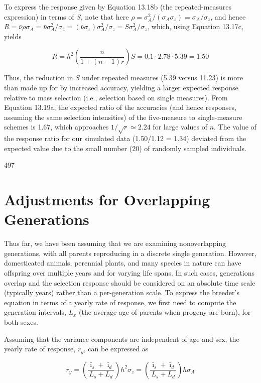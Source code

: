 \documentclass{article}
\begin{document}
To express the response given by Equation 13.18b (the repeated-measures expression) in terms of $S$, note that here $\rho = \sigma_A^2 / (\sigma_A \sigma_z) = \sigma_A / \sigma_z$, and hence $R = \bar{\nu} \rho \sigma_A = \bar{\nu} \sigma_A^2 / \sigma_z = (\bar{\nu} \sigma_z) \sigma_A^2 / \sigma_z = S \sigma_A^2 / \sigma_z$, which, using Equation 13.17c, yields

\begin{equation}
R=h^{2}\left(\frac{n}{1+(n-1)r}\right)S=0.1\cdot2.78\cdot5.39=1.50
\end{equation}

Thus, the reduction in $S$ under repeated measures (5.39 versus 11.23) is more than made up for by increased accuracy, yielding a larger expected response relative to mass selection (i.e., selection based on single measures). From Equation 13.19a, the expected ratio of the accuracies (and hence responses, assuming the same selection intensities) of the five-measure to single-measure schemes is 1.67, which approaches $1/\sqrt{r} \simeq 2.24$ for large values of $n$. The value of the response ratio for our simulated data (1.50/1.12 = 1.34) deviated from the expected value due to the small number (20) of randomly sampled individuals.

497

\section{Adjustments for Overlapping Generations}
Thus far, we have been assuming that we are examining nonoverlapping generations, with all parents reproducing in a discrete single generation. However, domesticated animals, perennial plants, and many species in nature can have offspring over multiple years and for varying life spans. In such cases, generations overlap and the selection response should be considered on an absolute time scale (typically years) rather than a per-generation scale. To express the breeder's equation in terms of a yearly rate of response, we first need to compute the generation intervals,  $ L_x $ (the average age of parents when progeny are born), for both sexes.

Assuming that the variance components are independent of age and sex, the yearly rate of response,  $ r_{y} $, can be expressed as

\begin{equation}
r_{y}=\left(\frac{\bar{\imath}_{s}+\bar{\imath}_{d}}{L_{s}+L_{d}}\right)h^{2}\sigma_{z}=\left(\frac{\bar{\imath}_{s}+\bar{\imath}_{d}}{L_{s}+L_{d}}\right)h\sigma_{A}
\tag{13.20}
\label{eq:13_20}
\end{equation}
\end{document}
